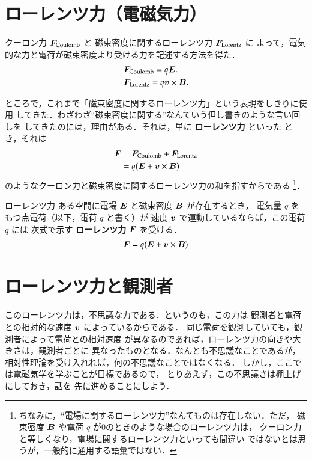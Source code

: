﻿
\section{ローレンツ力（電磁気力）}
    クーロン力 $\boldsymbol{F}_{\mathrm{Coulomb}}$ と
    磁束密度に関するローレンツ力 $\boldsymbol{F}_{\mathrm{Lorentz}}$ に
    よって，電気的な力と電荷が磁束密度より受ける力を記述する方法を得た．
        \begin{align*}
               & \boldsymbol{F}_{\mathrm{Coulomb}} = q\boldsymbol{E}. \\
                &\boldsymbol{F}_{\mathrm{Lorentz}} = q\boldsymbol{v}\times\boldsymbol{B}.
        \end{align*}

    ところで，これまで「磁束密度に関するローレンツ力」という表現をしきりに使用
    してきた．わざわざ“磁束密度に関する”なんていう但し書きのような言い回しを
    してきたのには，理由がある．それは，単に \textbf{ローレンツ力} といった
    とき，それは
        \begin{align*}
            \boldsymbol{F} &= \boldsymbol{F}_{\mathrm{Coulomb}} + \boldsymbol{F}_{\mathrm{Lorentz}} \\
                &= q(\boldsymbol{E} + \boldsymbol{v}\times\boldsymbol{B})
        \end{align*}
    のようなクーロン力と磁束密度に関するローレンツ力の和を指すからである
        \footnote{
            ちなみに，“電場に関するローレンツ力”なんてものは存在しない．ただ，
            磁束密度 $\boldsymbol{B}$ や電荷 $q$ が0のときのような場合のローレンツ力は，
            クーロン力と等しくなり，電場に関するローレンツ力といっても間違い
            ではないとは思うが，一般的に通用する語彙ではない．
        }．
    \begin{myshadebox}{ローレンツ力}
        ある空間に電場 $\boldsymbol{E}$ と磁束密度 $\boldsymbol{B}$ が存在するとき，
        電気量 $q$ をもつ点電荷（以下，電荷 $q$ と書く）が
        速度 $\boldsymbol{v}$ で運動しているならば，この電荷 $q$ には
        次式で示す \textbf{ローレンツ力} $\boldsymbol{F}$ を受ける．
        \begin{align}
            \boldsymbol{F} = q(\boldsymbol{E} + \boldsymbol{v}\times\boldsymbol{B})
        \end{align}
    \end{myshadebox}

\section{ローレンツ力と観測者}
        このローレンツ力は，不思議な力である．というのも，この力は
        観測者と電荷との相対的な速度 $\boldsymbol{v}$ によっているからである．
        同じ電荷を観測していても，観測者によって電荷との相対速度
        が異なるのであれば，ローレンツ力の向きや大きさは，観測者ごとに
        異なったものとなる．なんとも不思議なことであるが，
        相対性理論を受け入れれば，何の不思議なことではなくなる．
        しかし，ここでは電磁気学を学ぶことが目標であるので，
        とりあえず，この不思議さは棚上げにしておき，話を
        先に進めることにしよう．


